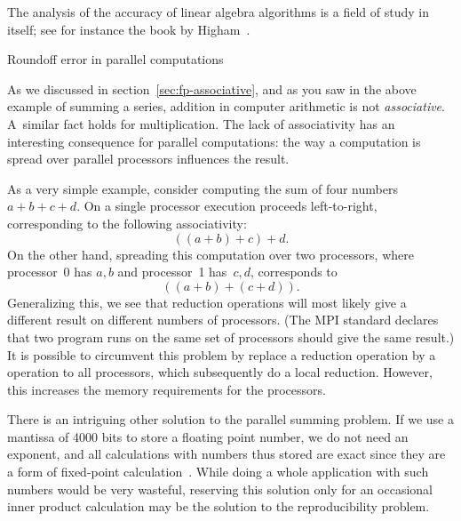 The analysis of the accuracy of linear algebra algorithms is a field
of study in itself; see for instance the book by
Higham~\cite{Higham:2002:ASN}.

 {Roundoff error in parallel computations}
\label{sec:roundoff-parallel}

As we discussed in section~\ref{sec:fp-associative}, and as you saw
in the above example of summing a series, addition in
computer arithmetic is not
\emph{associative}.
A~similar fact holds for
multiplication.
The lack of associativity has an interesting consequence for parallel
computations: the way a computation is spread over parallel processors
influences the result. 

As a very simple example, consider computing the sum of four numbers $a+b+c+d$.
On a single processor
execution proceeds left-to-right,
corresponding to the following associativity:
\begin{equation}
  ((a+b)+c)+d.
\end{equation}
On the other hand, spreading this computation over two processors, 
where processor~0 has $a,b$ and processor~1 has~$c,d$,
corresponds to
\begin{equation}
  ((a+b)+(c+d)).
\end{equation}
Generalizing this, we see that reduction operations will most likely
give a different result on different numbers of processors.
  (The MPI
  standard declares that two program runs on the same set of processors
  should give the same result.)
It is possible to circumvent this problem by replace a reduction operation
by a  operation to all processors, which subsequently 
do a local reduction. However, this increases the memory requirements for the 
processors.

There is an intriguing other solution to the parallel summing problem.
If we use a mantissa of 4000 bits to store a floating point number, we
do not need an exponent, and all calculations with numbers thus stored
are exact since they are a form of fixed-point
calculation~\cite{Kulisch:2011:VFE,Kulish:dotproduct}.  While doing a
whole application with such numbers would be very wasteful, reserving
this solution only for an occasional inner product calculation may be
the solution to the reproducibility problem.



